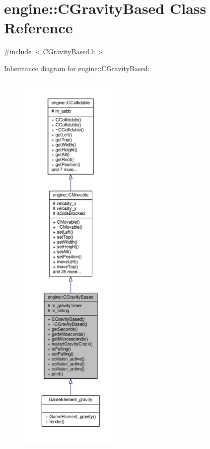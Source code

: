 \hypertarget{classengine_1_1CGravityBased}{\section{engine\-:\-:C\-Gravity\-Based Class Reference}
\label{classengine_1_1CGravityBased}
}


{\ttfamily \#include $<$C\-Gravity\-Based.\-h$>$}



Inheritance diagram for engine\-:\-:C\-Gravity\-Based\-:
\nopagebreak
\begin{figure}[H]
\begin{center}
\leavevmode
\includegraphics[height=550pt]{classengine_1_1CGravityBased__inherit__graph}
\end{center}
\end{figure}



